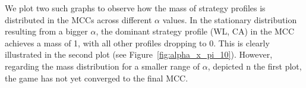 
        \noindent
        We plot two such graphs to observe how the mass of strategy profiles is distributed in the MCCs across different $\alpha$ values. In the stationary distribution resulting from a bigger $\alpha$, the dominant strategy profile (WL, CA) in the MCC achieves a mass of 1, with all other profiles dropping to 0. This is clearly illustrated in the second plot (see Figure~\ref{fig:alpha_x_pi_10}). However, regarding the mass distribution for a smaller range of $\alpha$, depicted n the first plot, the game has not yet converged to the final MCC.